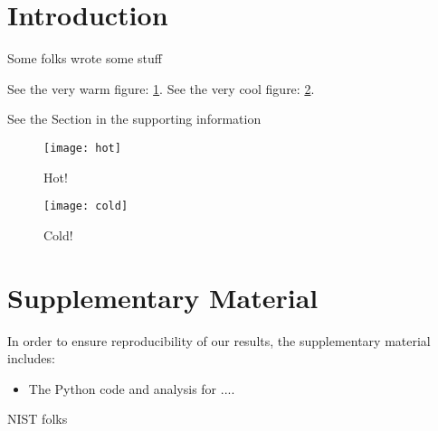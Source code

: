 
    
    \section{Introduction}

    Some folks wrote some stuff \cite{Span-BOOK-2000}

    See the very warm figure: \cref{fig:hot}.
    See the very cool figure: \cref{fig:cold}.
    
    See the Section  in the supporting information

    \begin{figure}[H]
    \caption{Hot! \label{fig:hot}}
    \texttt{[image: hot]}
    \end{figure}

    \begin{figure}[H]
    \caption{Cold! \label{fig:cold}}
    \texttt{[image: cold]}
    \end{figure}
    

    \section{Supplementary Material}
    In order to ensure reproducibility of our results, the supplementary material includes:
    \begin{itemize}
    	\item The Python code and analysis for ....
    \end{itemize}

    \begin{acknowledgments}
    NIST folks
    \end{acknowledgments}
    
	
